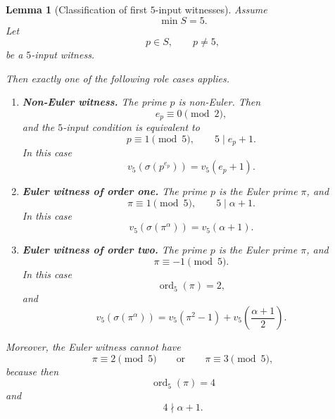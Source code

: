\documentclass[11pt]{article}
\newtheorem{lemma}[theorem]{Lemma}
\theoremstyle{definition}
\theoremstyle{remark}
\DeclareMathOperator{\ord}{ord}
\begin{document}
\begin{lemma}[Classification of first $5$-input witnesses]
\label{lem:q5-first-input-classification}
Assume
\[
  \min S=5.
\]
Let
\[
  p\in S,\qquad p\ne5,
\]
be a $5$-input witness.

Then exactly one of the following role cases applies.

\begin{enumerate}[label=(\roman*),leftmargin=2.2em]

\item \textbf{Non-Euler witness.}
      The prime $p$ is non-Euler.  Then
      \[
        e_p\equiv0\pmod2,
      \]
      and the $5$-input condition is equivalent to
      \[
        p\equiv1\pmod5,
        \qquad
        5\mid e_p+1.
      \]
      In this case
      \[
        v_5(\sigma(p^{e_p}))=v_5(e_p+1).
      \]

\item \textbf{Euler witness of order one.}
      The prime $p$ is the Euler prime $\pi$, and
      \[
        \pi\equiv1\pmod5,
        \qquad
        5\mid \alpha+1.
      \]
      In this case
      \[
        v_5(\sigma(\pi^\alpha))=v_5(\alpha+1).
      \]

\item \textbf{Euler witness of order two.}
      The prime $p$ is the Euler prime $\pi$, and
      \[
        \pi\equiv-1\pmod5.
      \]
      In this case
      \[
        \ord_5(\pi)=2,
      \]
      and
      \[
        v_5(\sigma(\pi^\alpha))
        =
        v_5(\pi^2-1)
        +
        v_5\!\left(\frac{\alpha+1}{2}\right).
      \]
\end{enumerate}

Moreover, the Euler witness cannot have
\[
  \pi\equiv2\pmod5
  \qquad\text{or}\qquad
  \pi\equiv3\pmod5,
\]
because then
\[
  \ord_5(\pi)=4
\]
and
\[
  4\nmid \alpha+1.
\]
\end{lemma}
\end{document}
